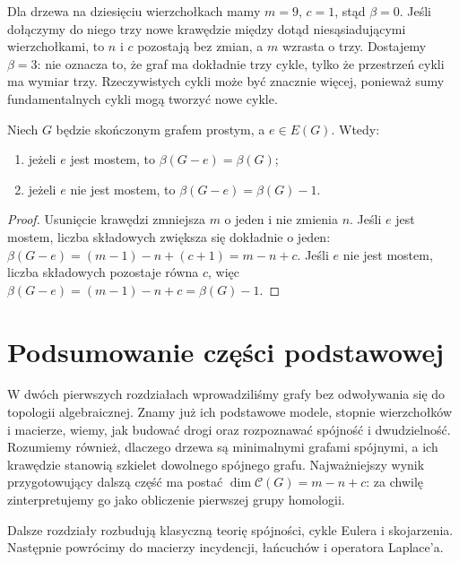 \begin{przyklad}
Dla drzewa na dziesięciu wierzchołkach mamy
$m=9$, $c=1$, stąd $\beta=0$.
Jeśli dołączymy do niego trzy nowe krawędzie
między dotąd niesąsiadującymi wierzchołkami,
to $n$ i $c$ pozostają bez zmian, a $m$
wzrasta o trzy. Dostajemy $\beta=3$:
nie oznacza to, że graf ma dokładnie trzy
cykle, tylko że przestrzeń cykli ma
wymiar trzy. Rzeczywistych cykli może
być znacznie więcej, ponieważ sumy
fundamentalnych cykli mogą tworzyć
nowe cykle.
\end{przyklad}

\begin{stwierdzenie}
Niech $G$ będzie skończonym grafem prostym,
a $e\in E(G)$. Wtedy:
\begin{enumerate}[label=(\roman*)]
\item jeżeli $e$ jest mostem, to $\beta(G-e)=\beta(G)$;
\item jeżeli $e$ nie jest mostem, to
$\beta(G-e)=\beta(G)-1$.
\end{enumerate}
\end{stwierdzenie}

\begin{proof}
Usunięcie krawędzi zmniejsza $m$ o jeden
i nie zmienia $n$. Jeśli $e$ jest mostem,
liczba składowych zwiększa się dokładnie
o jeden: $\beta(G-e)=(m-1)-n+(c+1)=m-n+c$.
Jeśli $e$ nie jest mostem, liczba
składowych pozostaje równa $c$, więc
$\beta(G-e)=(m-1)-n+c=\beta(G)-1$.
\end{proof}

\section*{Podsumowanie części podstawowej}

W dwóch pierwszych rozdziałach wprowadziliśmy grafy bez
odwoływania się do topologii algebraicznej. Znamy już ich
podstawowe modele, stopnie wierzchołków i macierze, wiemy,
jak budować drogi oraz rozpoznawać spójność i dwudzielność.
Rozumiemy również, dlaczego drzewa są minimalnymi grafami
spójnymi, a ich krawędzie stanowią szkielet dowolnego
spójnego grafu. Najważniejszy wynik przygotowujący dalszą
część ma postać $\dim\mathcal C(G)=m-n+c$: za chwilę
zinterpretujemy go jako obliczenie pierwszej grupy homologii.

Dalsze rozdziały rozbudują klasyczną teorię spójności,
cykle Eulera i skojarzenia. Następnie powrócimy do
macierzy incydencji, łańcuchów i operatora Laplace'a.

